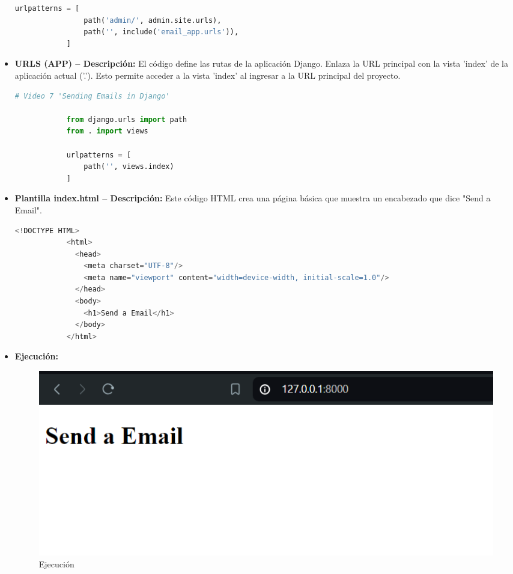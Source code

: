 \documentclass{article}
\begin{document}
\begin{itemize}
\begin{lstlisting}[language=Python]
            urlpatterns = [
                path('admin/', admin.site.urls),
                path('', include('email_app.urls')),
            ]
          \end{lstlisting}
        \item \textbf{URLS (APP) -- Descripción: }El código define las rutas de la aplicación Django. Enlaza la URL principal con 
          la vista 'index' de la aplicación actual ('.'). Esto permite acceder a la vista 'index' al ingresar a la URL principal del proyecto.
          \begin{lstlisting}[language=Python]
            # Video 7 'Sending Emails in Django'

            from django.urls import path
            from . import views

            urlpatterns = [
                path('', views.index)
            ]
          \end{lstlisting}
        \item \textbf{Plantilla index.html -- Descripción: }Este código HTML crea una página básica que muestra un encabezado que 
          dice "Send a Email".
          \begin{lstlisting}[language=Python]
            <!DOCTYPE HTML>
            <html>
              <head>
                <meta charset="UTF-8"/>
                <meta name="viewport" content="width=device-width, initial-scale=1.0"/>
              </head>
              <body>
                <h1>Send a Email</h1>
              </body>
            </html>
          \end{lstlisting}
        \item \textbf{Ejecución: }
          \begin{figure}[H]
            \centering
            \includegraphics[width=1\textwidth, keepaspectratio]{img/ejecucion4.png}
            \caption{Ejecución}
          \end{figure}
          \begin{figure}[H]
            \centering

\end{figure}
\end{itemize}
\end{document}
